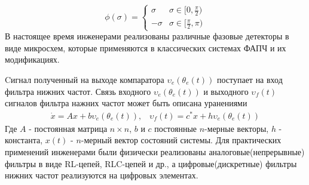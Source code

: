 \documentclass[a4paper,14pt]{extarticle} %
\begin{document}
\begin{equation*}
\phi(\sigma) = 
 \begin{cases}
   \sigma &\text{$\sigma \in [0,  \frac{\pi}{2})$}\\
   -\sigma &\text{$\sigma \in [\frac{\pi}{2},  \pi)$}
 \end{cases}
\end{equation*}
В настоящее время инженерами реализованы различные фазовые детекторы в виде микросхем, которые применяются в классических системах ФАПЧ и их модификациях.

Cигнал полученный на выходе компаратора $\upsilon_e(\theta_e(t))$ поступает на вход фильтра нижних частот. Связь входного $\upsilon_e(\theta_e(t))$ и выходного $\upsilon_f(t)$ сигналов фильтра нажних частот может быть описана уранениями
 \begin{equation*}
 \begin{aligned}
\dot{x} = Ax + b\upsilon_e(\theta_e(t)) \text{,} \quad 
\upsilon_f(t) = c^*x + h\upsilon_e(\theta_e(t))
 \end{aligned}
\end{equation*}
Где $A$ - постоянная матрица $n \times n$, $b$ и $c$ постоянные $n$-мерные векторы, $h$ - константа, $x(t)$ - $n$-мерный вектор состояний системы. Для практических применений инженерами были физически реализованы аналоговые(непрерывные) фильтры в виде RL-цепей, RLC-цепей и др., а цифровые(дискретные) фильтры нижних частот реализуются на цифровых элементах.
\end{document}

